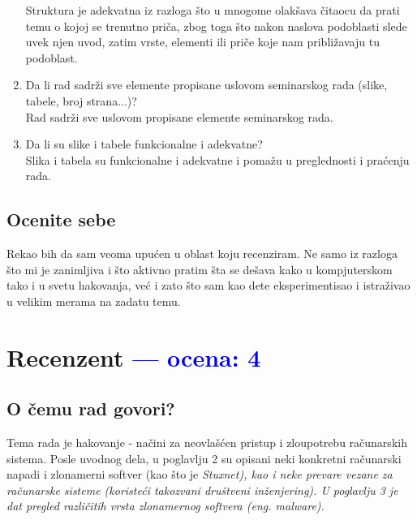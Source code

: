 \documentclass[a4paper]{report}
\newcommand{\odgovor}[1]{\textcolor{blue}{#1}}
\begin{document}
\begin{enumerate}
Struktura je adekvatna iz razloga što u mnogome olakšava čitaocu da prati temu o kojoj se trenutno priča, zbog toga što nakon naslova podoblasti slede uvek njen uvod, zatim vrste, elementi ili priče koje nam približavaju tu podoblast.
\item Da li rad sadrži sve elemente propisane uslovom seminarskog rada (slike, tabele, broj strana...)?\\
Rad sadrži sve uslovom propisane elemente seminarskog rada.
\item Da li su slike i tabele funkcionalne i adekvatne?\\
Slika i tabela su funkcionalne i adekvatne i pomažu u preglednosti i praćenju rada.
\end{enumerate}

\section{Ocenite sebe}
Rekao bih da sam veoma upućen u oblast koju recenziram. Ne samo iz razloga što mi je zanimljiva i što aktivno pratim šta se dešava kako u kompjuterskom tako i u svetu hakovanja, već i zato što sam kao dete eksperimentisao i istraživao u velikim merama na zadatu temu.



\chapter{Recenzent \odgovor{--- ocena: 4} }


\section{O čemu rad govori?}
Tema rada je hakovanje - načini za neovlašćen pristup i zloupotrebu računarskih sistema. Posle uvodnog dela, u poglavlju 2 su opisani neki konkretni računarski napadi i zlonamerni softver (kao što je \em{Stuxnet}\em), kao i neke prevare vezane za računarske sisteme (koristeći takozvani \em{društveni inženjering}\em). U poglavlju 3 je dat pregled različitih vrsta zlonamernog softvera (eng. \em{malware}\em).
\end{document}
